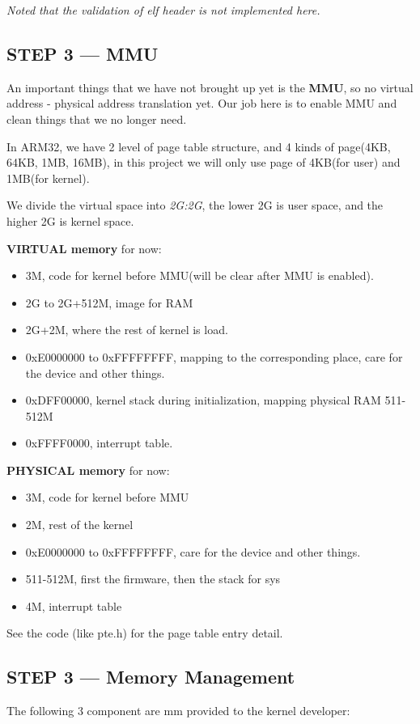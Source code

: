 \documentclass{article}
\begin{document}
\emph{Noted that the validation of elf header is not implemented here.}

\subsection{STEP 3 --- MMU}

An important things that we have not brought up yet is the \textbf{MMU}, so no virtual address - physical address translation yet. Our job here is to enable MMU and clean things that we no longer need.

In ARM32, we have 2 level of page table structure, and 4 kinds of page(4KB, 64KB, 1MB, 16MB), in this project we will only use page of 4KB(for user) and 1MB(for kernel).

We divide the virtual space into \emph{2G:2G}, the lower 2G is user space, and the higher 2G is kernel space.

\textbf{VIRTUAL memory} for now:
\begin{itemize}
	\item 3M, code for kernel before MMU(will be clear after MMU is enabled).
	\item	2G to 2G+512M, image for RAM
	\item	2G+2M, where the rest of kernel is load.
	\item	0xE0000000 to 0xFFFFFFFF, mapping to the corresponding place, care for the device and other things.
	\item	0xDFF00000, kernel stack during initialization, mapping physical RAM 511-512M
	\item	0xFFFF0000, interrupt table.
\end{itemize}

\textbf{PHYSICAL memory} for now:
\begin{itemize}
	\item 3M, code for kernel before MMU
	\item	2M, rest of the kernel
	\item	0xE0000000 to 0xFFFFFFFF, care for the device and other things.
	\item	511-512M, first the firmware, then the stack for sys
	\item	4M, interrupt table
\end{itemize}

See the code (like pte.h) for the page table entry detail.

\subsection{STEP 3 --- Memory Management}
The following 3 component are mm provided to the kernel developer:
\end{document}
